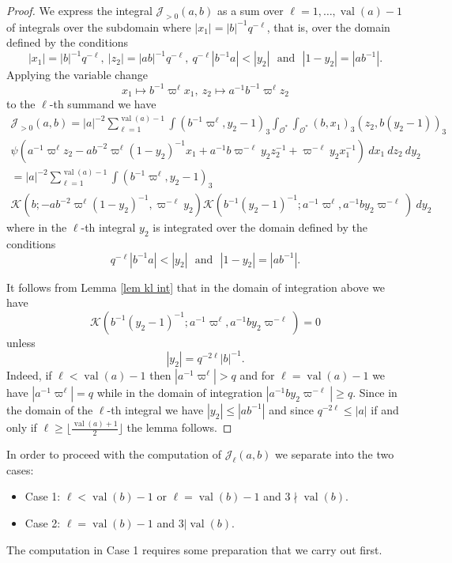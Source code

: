 \documentclass[12pt]{amsart}
\newcommand{\abs}[1]{\left|{#1}\right|}
\newcommand{\J}{\mathcal{J}}
\renewcommand{\O}{\mathcal{O}}
\newcommand{\val}{{\operatorname{val}}}
\newcommand{\Kl}{\mathcal{K}}
\theoremstyle{remark}
\begin{document}
\begin{proof}
We express the integral $\J_{>0}(a,b)$ as a sum over $\ell=1,\dots,\val(a)-1$ of integrals over the subdomain 
where $\abs{x_1}=\abs{b}^{-1}q^{-\ell}$, that is, over the domain defined by the conditions
\[
\abs{x_1}=\abs{b}^{-1}q^{-\ell},\ \abs{z_2}=\abs{ab}^{-1}q^{-\ell},\ q^{-\ell}\abs{b^{-1}a}<\abs{y_2}\ \ \ \text{and}\ \ \ \abs{1-y_2}=\abs{ab^{-1}}.
\]
Applying the variable change
\[
x_1\mapsto b^{-1}\varpi^\ell x_1,\ z_2\mapsto a^{-1}b^{-1}\varpi^\ell z_2
\]
to the $\ell$-th summand we have
\begin{multline*}
\J_{>0}(a,b)=\abs{a}^{-2}\sum_{\ell=1}^{\val(a)-1}\int (b^{-1}\varpi^\ell,y_2-1)_3\int_{\O^*}\int_{\O^*}(b,x_1)_3  (z_2,b(y_2-1))_3  \\ \psi(a^{-1}\varpi^\ell z_2-ab^{-2}\varpi^\ell(1-y_2)^{-1} x_1+a^{-1}b \varpi^{-\ell} y_2 z_2^{-1}+\varpi^{-\ell} y_2x_1^{-1})\ dx_1\ dz_2 \ dy_2\\=
 \abs{a}^{-2}\sum_{\ell=1}^{\val(a)-1}\int  (b^{-1}\varpi^\ell,y_2-1)_3\\ \Kl(b;-ab^{-2}\varpi^\ell(1-y_2)^{-1},\varpi^{-\ell} y_2)\Kl(b^{-1}(y_2-1)^{-1};a^{-1}\varpi^\ell ,a^{-1}by_2\varpi^{-\ell} )\ dy_2
\end{multline*}
where in the $\ell$-th integral $y_2$ is integrated over the domain defined by the conditions
\[
q^{-\ell}\abs{b^{-1}a}<\abs{y_2}\ \ \ \text{and}\ \ \ \abs{1-y_2}=\abs{ab^{-1}}.
\]

It follows from Lemma \ref{lem kl int} that in the domain of integration above we have 
\[
\Kl(b^{-1}(y_2-1)^{-1};a^{-1}\varpi^\ell ,a^{-1}by_2\varpi^{-\ell} )=0
\] 
unless 
\[
\abs{y_2}=q^{-2\ell}\abs{b}^{-1}.
\] 
Indeed, if $\ell<\val(a)-1$ then $\abs{a^{-1}\varpi^\ell}>q$ and for $\ell=\val(a)-1$ we have $\abs{a^{-1}\varpi^\ell}=q$ while in the domain of integration $\abs{a^{-1}by_2\varpi^{-\ell}}\ge q$. Since in the domain of the $\ell$-th integral we have $\abs{y_2}\le \abs{ab^{-1}}$ and since $q^{-2\ell}\le \abs{a}$ if and only if $\ell\ge \lfloor \frac{\val(a)+1}2\rfloor$ the lemma follows.
\end{proof}

In order to proceed with the computation of $\J_\ell(a,b)$ we separate into the two cases:
\begin{itemize}
\item Case 1: $\ell<\val(b)-1$ or $\ell=\val(b)-1$ and $3\nmid \val(b)$.
\item Case 2: $\ell=\val(b)-1$ and $3|\val(b)$.
\end{itemize}
The computation in Case 1 requires some preparation that we carry out first.
\end{document}
